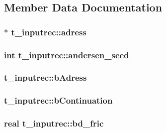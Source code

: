 \subsection{\-Member \-Data \-Documentation}
\hypertarget{structt__inputrec_a78976d591fe2116c74030169881edf0f}{
\subsubsection[{adress}]{ $\ast$ {\bf t\-\_\-inputrec\-::adress}}}\label{structt__inputrec_a78976d591fe2116c74030169881edf0f}
\hypertarget{structt__inputrec_ae0ae188d76e83e221dcf8bb71abbb1d7}{
\subsubsection[{andersen\-\_\-seed}]{\setlength{\rightskip}{0pt plus 5cm}int {\bf t\-\_\-inputrec\-::andersen\-\_\-seed}}}\label{structt__inputrec_ae0ae188d76e83e221dcf8bb71abbb1d7}
\hypertarget{structt__inputrec_ab5d8efcde9075167dff78e4089654c43}{
\subsubsection[{b\-Adress}]{ {\bf t\-\_\-inputrec\-::b\-Adress}}}\label{structt__inputrec_ab5d8efcde9075167dff78e4089654c43}
\hypertarget{structt__inputrec_aaf1f5a62f35026725bfe904f2b5970dd}{
\subsubsection[{b\-Continuation}]{ {\bf t\-\_\-inputrec\-::b\-Continuation}}}\label{structt__inputrec_aaf1f5a62f35026725bfe904f2b5970dd}
\hypertarget{structt__inputrec_aafbe3194a78549bcaa06ebe4f83b4cef}{
\subsubsection[{bd\-\_\-fric}]{\setlength{\rightskip}{0pt plus 5cm}real {\bf t\-\_\-inputrec\-::bd\-\_\-fric}}}\label{structt__inputrec_aafbe3194a78549bcaa06ebe4f83b4cef}
